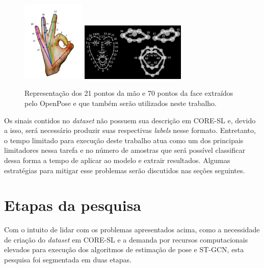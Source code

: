 \begin{figure}[ht]
    \centering
    \includegraphics[width=3cm]{images/keypoints_hand}
    \includegraphics[width=5cm]{images/keypoints_face}
    \caption{Representação dos 21 pontos da mão e 70 pontos da face extraídos pelo OpenPose e que também serão utilizados neste trabalho.}
    \label{fig:keypoints-face-hand}
\end{figure}
Os sinais contidos no \textit{dataset} não possuem sua descrição em CORE-SL e, devido a isso, será necessário produzir suas respectivas \textit{labels} nesse formato. Entretanto, o tempo limitado para execução deste trabalho atua como um dos principais limitadores nessa tarefa e no número de amostras que será possível classificar dessa forma a tempo de aplicar ao modelo e extrair resultados. Algumas estratégias para mitigar esse problemas serão discutidos nas seções seguintes.


\section{Etapas da pesquisa} %
Com o intuito de lidar com os problemas apresentados acima, como a necessidade de criação do  \textit{dataset} em CORE-SL e a demanda por recursos computacionais elevados para execução dos algoritmos de estimação de pose e ST-GCN, esta pesquisa foi segmentada em duas etapas. 

